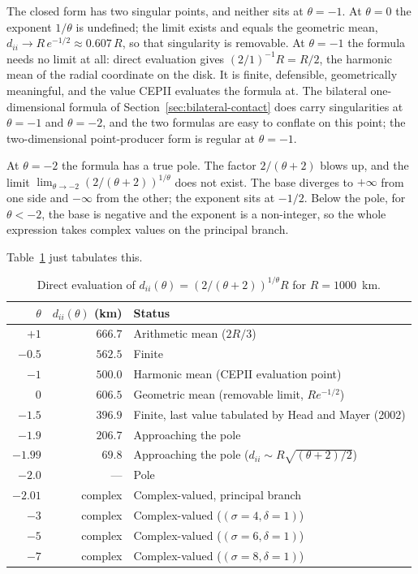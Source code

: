 \documentclass[11pt, letterpaper]{article}
\theoremstyle{definition}
\newcommand{\dii}{d_{ii}}
\begin{document}
The closed form has two singular points, and neither sits at
$\theta = -1$. At $\theta = 0$ the exponent $1/\theta$ is undefined;
the limit exists and equals the geometric mean,
$\dii \to R\, e^{-1/2} \approx 0.607\, R$, so that singularity is
removable. At $\theta = -1$ the formula needs no limit at all: direct
evaluation gives $(2/1)^{-1} R = R/2$, the harmonic mean of the
radial coordinate on the disk. It is finite, defensible,
geometrically meaningful, and the value CEPII evaluates the formula
at. The bilateral one-dimensional formula of
Section~\ref{sec:bilateral-contact} does carry singularities at
$\theta = -1$ and $\theta = -2$, and the two formulas are easy to
conflate on this point; the two-dimensional point-producer form is
regular at $\theta = -1$.

At $\theta = -2$ the formula has a true pole. The factor
$2/(\theta + 2)$ blows up, and the limit
$\lim_{\theta \to -2}(2/(\theta+2))^{1/\theta}$ does not exist. The
base diverges to $+\infty$ from one side and $-\infty$ from the
other; the exponent sits at $-1/2$. Below the pole, for $\theta < -2$,
the base is negative and the exponent is a non-integer, so the whole
expression takes complex values on the principal branch.

Table~\ref{tab:pole-values} just tabulates this.

\begin{table}[h]
\centering
\caption{Direct evaluation of $\dii(\theta) = (2/(\theta+2))^{1/\theta} R$
for $R = 1000$~km.\label{tab:pole-values}}
\small
\begin{tabular}{r r l}
\toprule
$\theta$ & $\dii(\theta)$ (km) & Status \\
\midrule
$+1$ & $666.7$ & Arithmetic mean ($2R/3$) \\
$-0.5$ & $562.5$ & Finite \\
$-1$ & $500.0$ & Harmonic mean (CEPII evaluation point) \\
$0$ & $606.5$ & Geometric mean (removable limit, $R e^{-1/2}$) \\
$-1.5$ & $396.9$ & Finite, last value tabulated by Head and Mayer (2002) \\
$-1.9$ & $206.7$ & Approaching the pole \\
$-1.99$ & $69.8$ & Approaching the pole ($\dii \sim R\sqrt{(\theta+2)/2}$) \\
$-2.0$ & --- & Pole \\
$-2.01$ & complex & Complex-valued, principal branch \\
$-3$ & complex & Complex-valued ($(\sigma = 4, \delta = 1)$) \\
$-5$ & complex & Complex-valued ($(\sigma = 6, \delta = 1)$) \\
$-7$ & complex & Complex-valued ($(\sigma = 8, \delta = 1)$) \\
\bottomrule
\end{tabular}
\end{table}
\end{document}
